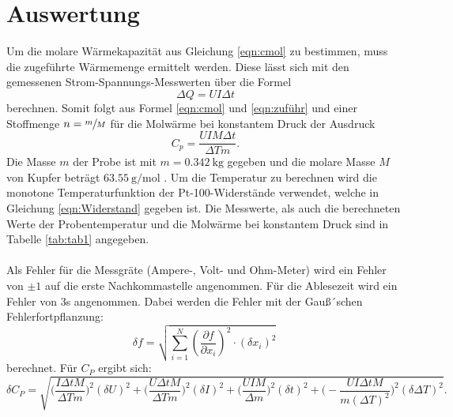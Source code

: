 \section{Auswertung}
\label{sec:Auswertung}
Um die molare Wärmekapazität aus Gleichung \ref{eqn:cmol} zu bestimmen, muss die zugeführte
Wärmemenge ermittelt werden. Diese lässt sich mit den gemessenen Strom-Spannungs-Messwerten über
die Formel
\begin{equation}
  \Delta Q = UI\Delta t
  \label{eqn:zuführ}
\end{equation}
berechnen.
Somit folgt aus Formel \ref{eqn:cmol} und \ref{eqn:zuführ} und einer Stoffmenge $n=\sfrac{m}{M}$
für die Molwärme bei konstantem Druck der Ausdruck
\begin{equation}
  C_p=\frac{UIM\Delta t}{\Delta T m}.
  \label{eqn:Cp}
\end{equation}
Die Masse $m$ der Probe ist mit $m=\SI{0.342}{\kg}$ gegeben und die molare Masse $M$ von
Kupfer beträgt $\SI{63.55}{\g\per\mol}$ \cite{kompress}.
Um die Temperatur zu berechnen wird die monotone Temperaturfunktion der
Pt-100-Widerstände verwendet, welche in Gleichung \ref{eqn:Widerstand}
gegeben ist. %
Die Messwerte, als auch die berechneten Werte der Probentemperatur und die
Molwärme bei konstantem Druck sind in Tabelle \ref{tab:tab1} angegeben.\\
\\
Als Fehler für die Messgräte (Ampere-, Volt- und Ohm-Meter) wird ein Fehler von
$\pm 1$ auf die erste Nachkommastelle angenommen. Für die Ablesezeit wird ein
Fehler von 3\;s angenommen.
Dabei werden die Fehler mit der Gauß´schen Fehlerfortpflanzung:
\begin{equation}
  \delta f = \sqrt{ \sum_{i=1}^N \left( \frac{\partial f}{\partial x_i}\right)^2
  \cdot (\delta x_i)^2  } \:
  \label{eqn:gaus}
\end{equation}
berechnet. Für $C_P$ ergibt sich:
\begin{equation}
  \delta C_P=\sqrt{\Big(\frac{I\Delta t M}{\Delta T m}\Big)^2 (\delta U)^2+\Big(\frac{U\Delta t M}{\Delta T m}\Big)^2 (\delta I)^2
  +\Big(\frac{UIM}{\Delta m}\Big)^2 (\delta t)^2  +\Big (-\frac{UI\Delta t M}{m (\Delta T)^2}\Big)^2 (\delta\Delta T)^2}.
  \label{eqn:fehler}
\end{equation}



